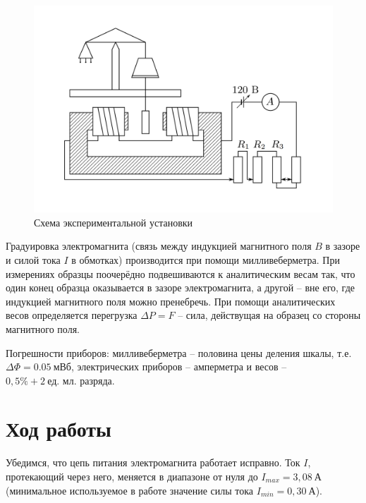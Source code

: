 \documentclass[a4paper,12pt]{article}
\begin{document}
\begin{figure}[h]
	\centering
	\includegraphics[scale=0.35]{Device}
	\caption{Схема экспериментальной установки} \label{Установка}
\end{figure}

Градуировка электромагнита (связь между индукцией магнитного поля $B$ в зазоре и силой тока $I$ в обмотках) производится при помощи милливеберметра. При измерениях образцы поочерёдно подвешиваются к аналитическим весам так, что один конец образца оказывается в зазоре электромагнита, а другой -- вне его, где индукцией магнитного поля можно пренебречь. При помощи аналитических весов определяется перегрузка $\Delta P=F$ -- сила, действущая на образец со стороны магнитного поля.

Погрешности приборов: милливеберметра -- половина цены деления шкалы, т.е. $\Delta\Phi=0.05~\text{мВб}$, электрических приборов -- амперметра и весов -- $0,5\%+2~\text{ед. мл. разряда}$.

\section*{Ход работы}

Убедимся, что цепь питания электромагнита работает исправно. Ток $I$, протекающий через него, меняется в диапазоне от нуля до $I_{max}=3,08~\text{А}$ (минимальное используемое в работе значение силы тока $I_{min}=0,30~\text{А}$).
\end{document}
